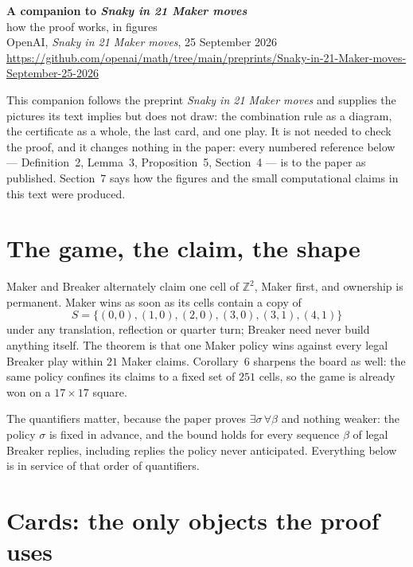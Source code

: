 \documentclass[11pt,a4paper]{article}
\newcommand{\Z}{\mathbb Z}
\newcommand{\Snaky}{S}
\newcommand{\paper}{\emph{Snaky in 21 Maker moves}}
\begin{document}
\begin{center}
{\LARGE\bfseries A companion to \emph{Snaky in 21 Maker moves}}\\[6pt]
{\large how the proof works, in figures}\\[8pt]
{\small OpenAI, \emph{Snaky in 21 Maker moves}, 25 September 2026\\
\url{https://github.com/openai/math/tree/main/preprints/Snaky-in-21-Maker-moves-September-25-2026}}
\end{center}

\vspace{-4pt}

This companion follows the preprint \paper{} and supplies the pictures its text
implies but does not draw: the combination rule as a diagram, the certificate as
a whole, the last card, and one play. It is not needed to check the proof, and it
changes nothing in the paper: every numbered reference below --- Definition~2,
Lemma~3, Proposition~5, Section~4 --- is to the paper as published. Section~7
says how the figures and the small computational claims in this text were
produced.

\section{The game, the claim, the shape}

Maker and Breaker alternately claim one cell of $\Z^2$, Maker first, and ownership
is permanent. Maker wins as soon as its cells contain a copy of
\[
\Snaky=\{(0,0),(1,0),(2,0),(3,0),(3,1),(4,1)\}
\]
under any translation, reflection or quarter turn; Breaker need never build
anything itself. The theorem is that one Maker policy wins against every legal
Breaker play within $21$ Maker claims. Corollary~6 sharpens the board as well:
the same policy confines its claims to a fixed set of $251$ cells, so the game is
already won on a $17\times17$ square.

The quantifiers matter, because the paper proves $\exists\sigma\,\forall\beta$ and
nothing weaker: the policy $\sigma$ is fixed in advance, and the bound holds for
every sequence $\beta$ of legal Breaker replies, including replies the policy
never anticipated. Everything below is in service of that order of quantifiers.



\section{Cards: the only objects the proof uses}
\end{document}
